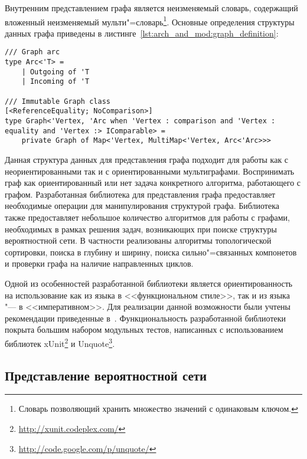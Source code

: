 Внутренним представлением графа является неизменяемый словарь, содержащий вложенный неизменяемый мульти"=словарь\footnote{Словарь позволяющий хранить множество значений с одинаковым ключом.}.
Основные определения структуры данных графа приведены в листинге~\ref{lst:arch_and_mod:graph_definition}:
\begin{lstlisting}[style=fsharpstyle,caption={Определение структуры данных для представления графа}, label=lst:arch_and_mod:graph_definition]
/// Graph arc
type Arc<'T> =
    | Outgoing of 'T
    | Incoming of 'T

/// Immutable Graph class
[<ReferenceEquality; NoComparison>]
type Graph<'Vertex, 'Arc when 'Vertex : comparison and 'Vertex : equality and 'Vertex :> IComparable> =
    private Graph of Map<'Vertex, MultiMap<'Vertex, Arc<'Arc>>>
\end{lstlisting}

Данная структура данных для представления графа подходит для работы как с неориентированными так и с ориентированными мультиграфами.
Воспринимать граф как ориентированный или нет задача конкретного алгоритма, работающего с графом.
Разработанная библиотека для представления графа предоставляет необходимые операции для манипулирования структурой графа.
Библиотека также предоставляет небольшое количество алгоритмов для работы с графами, необходимых в рамках решения задач, возникающих при поиске структуры вероятностной сети.
В частности реализованы алгоритмы топологической сортировки, поиска в глубину и ширину, поиска сильно"=связанных компонетов и проверки графа на наличие направленных циклов.

Одной из особенностей разработанной библиотеки является ориентированность на использование как из языка \fsharp{} в <<функциональном стиле>>, так и из языка \csharp{} "--- в <<императивном>>.
Для реализации данной возможности были учтены рекомендации приведенные в~\cite{fsdg_2010}.
Функциональность разработанной библиотеки покрыта большим набором модульных тестов, написанных с использованием библиотек xUnit\footnote{\url{http://xunit.codeplex.com/}} и Unquote\footnote{\url{http://code.google.com/p/unquote/}}.


\subsection{Представление вероятностной сети}
\label{sub:arch_and_mod:probab_net}

